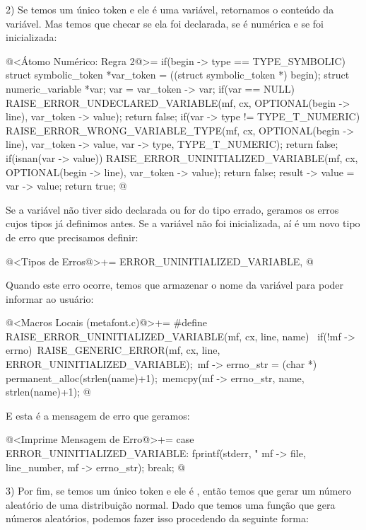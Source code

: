 2) Se temos um único token e ele é uma variável, retornamos o conteúdo
da variável. Mas temos que checar se ela foi declarada, se é numérica
e se foi inicializada:

\iniciocodigo
@<Átomo Numérico: Regra 2@>=
if(begin -> type == TYPE_SYMBOLIC){
  struct symbolic_token *var_token = ((struct symbolic_token *) begin);
  struct numeric_variable *var;
  var = var_token -> var;
  if(var == NULL){
    RAISE_ERROR_UNDECLARED_VARIABLE(mf, cx, OPTIONAL(begin -> line),
                                   var_token -> value);
    return false;
  }
  if(var -> type != TYPE_T_NUMERIC){
    RAISE_ERROR_WRONG_VARIABLE_TYPE(mf, cx, OPTIONAL(begin -> line),
                                   var_token -> value, var -> type,
                                   TYPE_T_NUMERIC);
    return false;
  }
  if(isnan(var -> value)){
    RAISE_ERROR_UNINITIALIZED_VARIABLE(mf, cx, OPTIONAL(begin -> line),
                                      var_token -> value);
    return false;
  }
  result -> value = var -> value;
  return true;
}
@
\fimcodigo

Se a variável não tiver sido declarada ou for do tipo errado, geramos
os erros cujos tipos já definimos antes. Se a variável não foi
inicializada, aí é um novo tipo de erro que precisamos definir:

\iniciocodigo
@<Tipos de Erros@>+=
ERROR_UNINITIALIZED_VARIABLE,
@
\fimcodigo

Quando este erro ocorre, temos que armazenar o nome da variável para
poder informar ao usuário:

\iniciocodigo
@<Macros Locais (metafont.c)@>+=
#define RAISE_ERROR_UNINITIALIZED_VARIABLE(mf, cx, line, name) {\
  if(!mf -> errno){\
    RAISE_GENERIC_ERROR(mf, cx, line, ERROR_UNINITIALIZED_VARIABLE);\
    mf -> errno_str = (char *) permanent_alloc(strlen(name)+1);\
    memcpy(mf -> errno_str, name, strlen(name)+1);}}
@
\fimcodigo

E esta é a mensagem de erro que geramos:

\iniciocodigo
@<Imprime Mensagem de Erro@>+=
case ERROR_UNINITIALIZED_VARIABLE:
  fprintf(stderr, "%
          mf -> file, line_number, mf -> errno_str);
  break;
@
\fimcodigo

3) Por fim, se temos um único token e ele é ,
então temos que gerar um número aleatório de uma distribuição
normal. Dado que temos uma função que gera números aleatórios, podemos
fazer isso procedendo da seguinte forma:

